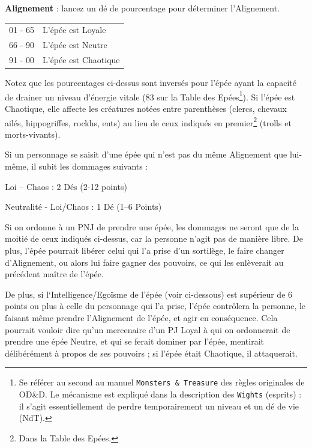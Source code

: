 \documentclass[11pt]{article}
\begin{document}
{{\bigskip

\textbf{Alignement} : lancez un dé de pourcentage pour déterminer l'Alignement.

\bigskip

{\parindent2.5cm
\begin{tabular}{p{2.8cm}l}
01 - 65
& L'épée est Loyale \\
66 - 90
& L'épée est Neutre \\
91 - 00
& L'épée est Chaotique \\
\end{tabular}}

\medskip

Notez que les pourcentages ci-dessus sont inversés pour l'épée ayant la capacité de drainer un niveau d'énergie vitale (83 sur la Table des Epées\footnote
{Se référer au second au manuel \texttt{Monsters \& Treasure} des règles originales de OD\&D. Le mécanisme est expliqué dans la description des \texttt{Wights} (esprits) : il s'agit essentiellement de perdre temporairement un niveau et un dé de vie (NdT).}). Si l'épée est Chaotique, elle affecte les créatures notées entre parenthèses (clercs, chevaux ailés, hippogriffes, rockhs, ents) au lieu de ceux indiqués en premier\footnote{Dans la Table des Epées.} (trolls et morts-vivants).

\medskip

Si un personnage se saisit d'une épée qui n'est pas du même Alignement que lui-même, il subit les dommages suivants :

\medskip

{\parindent2cm Loi -- Chaos : 2 Dés (2-12 points)

Neutralité - Loi/Chaos : 1 Dé (1--6 Points)}

\medskip

Si on ordonne à un PNJ de prendre une épée, les dommages ne seront que de la moitié de ceux indiqués ci-dessus, car la personne n'agit pas de manière libre. De plus, l'épée pourrait libérer celui qui l'a prise d'un sortilège, le faire changer d'Alignement, ou alors lui faire gagner des pouvoirs, ce qui les enlèverait au précédent maître de l'épée.

\medskip

De plus, si l‘Intelligence/Egoïsme de l'épée (voir ci-dessous) est supérieur de 6 points ou plus à celle du personnage qui l'a prise, l'épée contrôlera la personne, le faisant même prendre l'Alignement de l'épée, et agir en conséquence. Cela pourrait vouloir dire qu'un mercenaire d'un PJ Loyal à qui on ordonnerait de prendre une épée Neutre, et qui se ferait dominer par l'épée, mentirait délibérément à propos de ses pouvoirs ; si l'épée était Chaotique, il attaquerait.

}}
\end{document}
